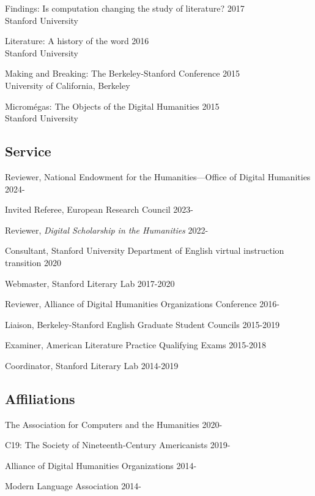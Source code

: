 \documentclass[
  12pt,
  letterpaper,
]{article}
\begin{document}
Findings: Is computation changing the study of literature? \hfill 2017\\
Stanford University

Literature: A history of the word \hfill 2016\\
Stanford University

Making and Breaking: The Berkeley-Stanford Conference \hfill 2015\\
University of California, Berkeley

Micromégas: The Objects of the Digital Humanities \hfill 2015\\
Stanford University

\hypertarget{service}{%
\subsection{Service}\label{service}}

Reviewer, National Endowment for the Humanities—Office of Digital Humanities \hfill 2024-

Invited Referee, European Research Council \hfill 2023-

Reviewer, \emph{Digital Scholarship in the Humanities} \hfill 2022-

Consultant, Stanford University Department of English virtual
instruction transition \hfill 2020

Webmaster, Stanford Literary Lab \hfill 2017-2020

Reviewer, Alliance of Digital Humanities Organizations Conference
\hfill 2016-

Liaison, Berkeley-Stanford English Graduate Student Councils
\hfill 2015-2019

Examiner, American Literature Practice Qualifying Exams \hfill 2015-2018

Coordinator, Stanford Literary Lab \hfill 2014-2019

\hypertarget{affiliations}{%
\subsection{Affiliations}\label{affiliations}}

The Association for Computers and the Humanities \hfill 2020-

C19: The Society of Nineteenth-Century Americanists \hfill 2019-

Alliance of Digital Humanities Organizations \hfill 2014-

Modern Language Association \hfill 2014-
\end{document}
